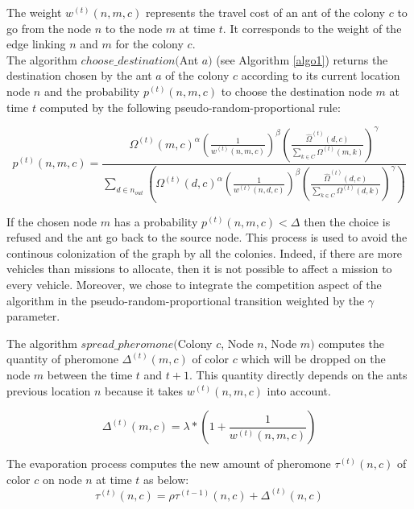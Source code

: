 \documentclass[a4paper,10pt]{article}
\begin{document}
The weight $w^{(t)}(n,m,c)$ represents the travel cost of an ant of the colony $c$ to go from the node $n$ to the node $m$ at time $t$. It corresponds to the weight of the edge linking $n$ and $m$ for the colony $c$.\\

The algorithm $choose\_destination($Ant $a)$ (see Algorithm \ref{algo1}) returns the destination chosen by the ant $a$ of the colony $c$ according to its current location node $n$ and the probability $p^{(t)}(n,m,c)$ to choose the destination node $m$ at time $t$ computed by the following pseudo-random-proportional rule:

\begin{equation*}
  p^{(t)}(n,m,c) = \frac
    {
      \Omega^{(t)}(m,c)^{\alpha}
      \left( \frac{1}{w^{(t)}(n,m,c)} \right) ^{\beta}
      \left( \frac{\hat \Omega^{(t)}(d,c)}{\sum_{k \in C} \Omega^{(t)}(m,k)} \right)^{\gamma}
    }
    {
      \sum_{d \in n_{out}} \left(
	\Omega^{(t)}(d,c)^{\alpha}
	\left( \frac{1}{w^{(t)}(n,d,c)} \right)^{\beta}
	\left( \frac{\hat \Omega^{(t)}(d,c)}{\sum_{k \in C} \Omega^{(t)}(d,k)} \right)^{\gamma}
      \right)
    }
\end{equation*}

If the chosen node $m$ has a probability $p^{(t)}(n,m,c) < \Delta$ then the choice is refused and the ant go back to the source node. This process is used to avoid the continous colonization of the graph by all the colonies. Indeed, if there are more vehicles than missions to allocate, then it is not possible to affect a mission to every vehicle. Moreover, we chose to integrate the competition aspect of the algorithm in the pseudo-random-proportional transition weighted by the $\gamma$ parameter.

The algorithm $spread\_pheromone($Colony $c$, Node $n$, Node $m)$ computes the quantity of pheromone $\Delta^{(t)}(m,c)$ of color $c$  which will be dropped on the node $m$ between the time $t$ and $t+1$. This quantity directly depends on the ants previous location $n$ because it takes $w^{(t)}(n,m,c)$ into account.

\begin{equation*}
 \Delta^{(t)}(m,c) = \lambda * \left(1 + \frac{1}{w^{(t)}(n,m,c)} \right)
\end{equation*}

The evaporation process computes the new amount of pheromone $\tau^{(t)}(n,c)$ of color $c$ on node $n$ at time $t$ as below:
\begin{equation*}
 \tau^{(t)}(n,c) = \rho \tau^{(t-1)}(n,c) + \Delta^{(t)}(n,c)
\end{equation*}
\end{document}
